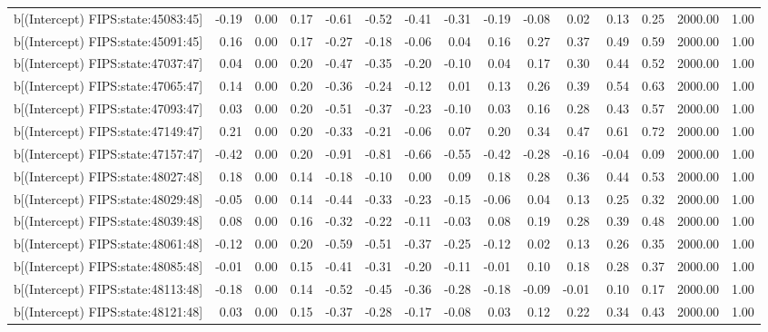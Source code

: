 \begin{table}[ht]
\begin{tabular}{rrrrrrrrrrrrrrr}
  b[(Intercept) FIPS:state:45083:45] & -0.19 & 0.00 & 0.17 & -0.61 & -0.52 & -0.41 & -0.31 & -0.19 & -0.08 & 0.02 & 0.13 & 0.25 & 2000.00 & 1.00 \\ 
  b[(Intercept) FIPS:state:45091:45] & 0.16 & 0.00 & 0.17 & -0.27 & -0.18 & -0.06 & 0.04 & 0.16 & 0.27 & 0.37 & 0.49 & 0.59 & 2000.00 & 1.00 \\ 
  b[(Intercept) FIPS:state:47037:47] & 0.04 & 0.00 & 0.20 & -0.47 & -0.35 & -0.20 & -0.10 & 0.04 & 0.17 & 0.30 & 0.44 & 0.52 & 2000.00 & 1.00 \\ 
  b[(Intercept) FIPS:state:47065:47] & 0.14 & 0.00 & 0.20 & -0.36 & -0.24 & -0.12 & 0.01 & 0.13 & 0.26 & 0.39 & 0.54 & 0.63 & 2000.00 & 1.00 \\ 
  b[(Intercept) FIPS:state:47093:47] & 0.03 & 0.00 & 0.20 & -0.51 & -0.37 & -0.23 & -0.10 & 0.03 & 0.16 & 0.28 & 0.43 & 0.57 & 2000.00 & 1.00 \\ 
  b[(Intercept) FIPS:state:47149:47] & 0.21 & 0.00 & 0.20 & -0.33 & -0.21 & -0.06 & 0.07 & 0.20 & 0.34 & 0.47 & 0.61 & 0.72 & 2000.00 & 1.00 \\ 
  b[(Intercept) FIPS:state:47157:47] & -0.42 & 0.00 & 0.20 & -0.91 & -0.81 & -0.66 & -0.55 & -0.42 & -0.28 & -0.16 & -0.04 & 0.09 & 2000.00 & 1.00 \\ 
  b[(Intercept) FIPS:state:48027:48] & 0.18 & 0.00 & 0.14 & -0.18 & -0.10 & 0.00 & 0.09 & 0.18 & 0.28 & 0.36 & 0.44 & 0.53 & 2000.00 & 1.00 \\ 
  b[(Intercept) FIPS:state:48029:48] & -0.05 & 0.00 & 0.14 & -0.44 & -0.33 & -0.23 & -0.15 & -0.06 & 0.04 & 0.13 & 0.25 & 0.32 & 2000.00 & 1.00 \\ 
  b[(Intercept) FIPS:state:48039:48] & 0.08 & 0.00 & 0.16 & -0.32 & -0.22 & -0.11 & -0.03 & 0.08 & 0.19 & 0.28 & 0.39 & 0.48 & 2000.00 & 1.00 \\ 
  b[(Intercept) FIPS:state:48061:48] & -0.12 & 0.00 & 0.20 & -0.59 & -0.51 & -0.37 & -0.25 & -0.12 & 0.02 & 0.13 & 0.26 & 0.35 & 2000.00 & 1.00 \\ 
  b[(Intercept) FIPS:state:48085:48] & -0.01 & 0.00 & 0.15 & -0.41 & -0.31 & -0.20 & -0.11 & -0.01 & 0.10 & 0.18 & 0.28 & 0.37 & 2000.00 & 1.00 \\ 
  b[(Intercept) FIPS:state:48113:48] & -0.18 & 0.00 & 0.14 & -0.52 & -0.45 & -0.36 & -0.28 & -0.18 & -0.09 & -0.01 & 0.10 & 0.17 & 2000.00 & 1.00 \\ 
  b[(Intercept) FIPS:state:48121:48] & 0.03 & 0.00 & 0.15 & -0.37 & -0.28 & -0.17 & -0.08 & 0.03 & 0.12 & 0.22 & 0.34 & 0.43 & 2000.00 & 1.00 \\ 

\end{tabular}
\end{table}
